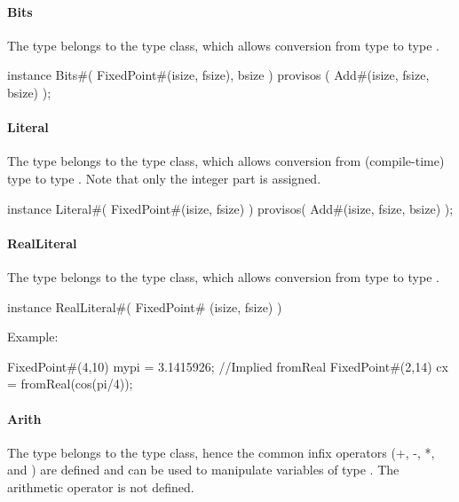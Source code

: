 \paragraph{Bits}

The type  belongs to the  type class, which
allows conversion from type  to type .

\begin{libverbatim}
instance Bits#( FixedPoint#(isize, fsize), bsize ) 
   provisos ( Add#(isize, fsize, bsize) );
\end{libverbatim}


\paragraph{Literal}

The type  belongs to the  type class,
which allows conversion from (compile-time) type  to type
.  Note that only the integer part is assigned.

\begin{libverbatim}
instance Literal#( FixedPoint#(isize, fsize) ) 
   provisos( Add#(isize, fsize, bsize) );
\end{libverbatim}



\paragraph{RealLiteral}

The type  belongs to the  type class,
which allows conversion from type  to type .


\begin{libverbatim}
instance RealLiteral#( FixedPoint# (isize, fsize) ) 
\end{libverbatim}

Example:
\begin{libverbatim}
    FixedPoint#(4,10) mypi = 3.1415926;  //Implied fromReal
    FixedPoint#(2,14) cx = fromReal(cos(pi/4));
\end{libverbatim}


\paragraph{Arith}

The type  belongs to the  type class,
hence the common infix operators (+, -, *, and \te{/}) are defined and
can be used to 
manipulate variables of type . The arithmetic operator
 \te{\%}  is not defined.

